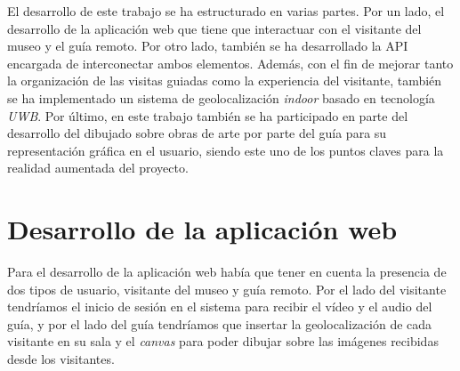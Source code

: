 
El desarrollo de este trabajo se ha estructurado en varias partes.
Por un lado, el desarrollo de la aplicación web que tiene que interactuar con el visitante del museo y el guía remoto. Por otro lado, también se ha desarrollado la API encargada de interconectar ambos elementos.
Además, con el fin de mejorar tanto la organización de las visitas guiadas como la experiencia del visitante, también se ha implementado un sistema de geolocalización \textit{indoor} basado en tecnología \textit{UWB}.
Por último, en este trabajo también se ha participado en parte del desarrollo del dibujado sobre obras de arte por parte del guía para su representación gráfica en el usuario, siendo este uno de los puntos claves para la realidad aumentada del proyecto.

\section{Desarrollo de la aplicación web}
Para el desarrollo de la aplicación web había que tener en cuenta la presencia de dos tipos de usuario, visitante del museo y guía remoto. Por el lado del visitante tendríamos el inicio de sesión en el sistema para recibir el vídeo y el audio del guía, y por el lado del guía tendríamos que insertar la geolocalización de cada visitante en su sala y el \textit{canvas} para poder dibujar sobre las imágenes recibidas desde los visitantes.

